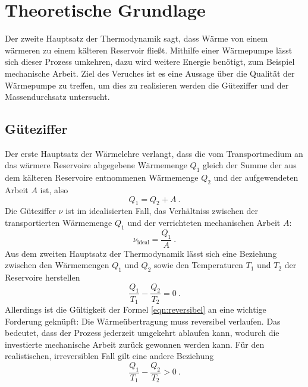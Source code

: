 \section{Theoretische Grundlage}
\label{sec:Theorie}

Der zweite Hauptsatz der Thermodynamik sagt, dass Wärme von einem wärmeren zu einem kälteren Reservoir fließt. Mithilfe einer Wärmepumpe lässt sich dieser Prozess umkehren, dazu wird weitere Energie benötigt, zum Beispiel mechanische Arbeit. Ziel des Veruches ist es eine Aussage über die Qualität der Wärmepumpe zu treffen, um dies zu realisieren werden die Güteziffer und der Massendurchsatz untersucht.

\subsection{Güteziffer}
Der erste Hauptsatz der Wärmelehre verlangt, dass die vom Transportmedium an das wärmere Reservoire abgegebene Wärmemenge $Q_\text{1}$ gleich der Summe der aus dem kälteren Reservoire entnommenen Wärmemenge $Q_\text{2}$ und der aufgewendeten Arbeit $A$ ist, also
\begin{equation}
	\label{eqn:Q1}
		Q_\text{1} = Q_\text{2} + A \ .
\end{equation}
Die Güteziffer $\nu$ ist im idealisierten Fall, das Verhältniss zwischen der transportierten Wärmemenge $Q_\text{1}$ und der verrichteten mechanischen Arbeit $A$:
\begin{equation}
	\label{eqn:nu}
	\nu_\text{ideal} = \frac{Q_\text{1}}{A} \ .
\end{equation}
Aus dem zweiten Hauptsatz der Thermodynamik lässt sich eine Beziehung zwischen den Wärmemengen $Q_\text{1}$ und $Q_\text{2}$ sowie den Temperaturen $T_\text{1}$ und $T_\text{2}$ der Reservoire herstellen
\begin{equation}
	\label{eqn:reversibel}
	\frac{Q_\text{1}}{T_\text{1}} - \frac{Q_\text{2}}{T_\text{2}} = 0 \ .
\end{equation}
Allerdings ist die Gültigkeit der Formel \ref{eqn:reversibel} an eine wichtige Forderung geknüpft: Die Wärmeübertragung muss reversibel verlaufen. Das bedeutet, dass der Prozess jederzeit umgekehrt ablaufen kann, wodurch die investierte mechanische Arbeit zurück gewonnen werden kann. Für den realistischen, irreversiblen Fall gilt eine andere Beziehung
\begin{equation}
	\label{eqn:irreversibel}
	\frac{Q_\text{1}}{T_\text{1}} - \frac{Q_\text{2}}{T_\text{2}} > 0 \ .
\end{equation}
